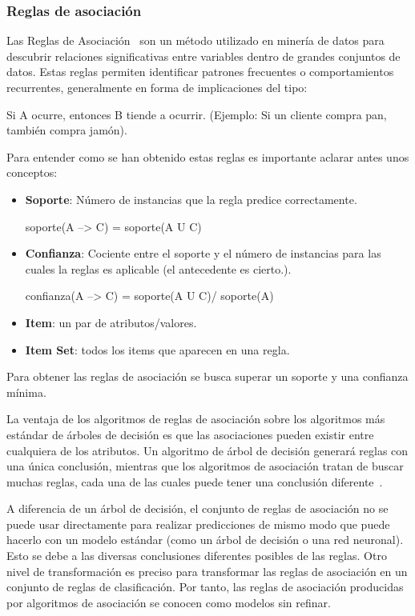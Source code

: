 \subsubsection{Reglas de asociación}
Las Reglas de Asociación~\cite{DTM:Rules} son un método utilizado en minería de datos para descubrir relaciones significativas entre variables dentro de grandes conjuntos de datos. Estas reglas permiten identificar patrones frecuentes o comportamientos recurrentes, generalmente en forma de implicaciones del tipo:

Si A ocurre, entonces B tiende a ocurrir.
(Ejemplo: Si un cliente compra pan, también compra jamón).

Para entender como se han obtenido estas reglas es importante aclarar antes unos conceptos:


\begin{itemize}
    \item \textbf{Soporte}: Número de instancias que la regla predice correctamente.
    
    soporte(A --> C) = soporte(A U C)
    
    \item \textbf{Confianza}: Cociente entre el soporte y el número de instancias para las cuales la reglas es aplicable (el antecedente es cierto.).
    
    confianza(A --> C) = soporte(A U C)/ soporte(A)
    
    \item \textbf{Item}: un par de atributos/valores.

    \item \textbf{Item Set}:  todos los items que aparecen en una regla.
    
\end{itemize}

Para obtener las reglas de asociación se busca superar un soporte y una confianza mínima.  

La ventaja de los algoritmos de reglas de asociación sobre los algoritmos más estándar de árboles de decisión es que las asociaciones pueden existir entre cualquiera de los atributos. Un algoritmo de árbol de decisión generará reglas con una única conclusión, mientras que los algoritmos de asociación tratan de buscar muchas reglas, cada una de las cuales puede tener una conclusión diferente~\cite{DTM:Aso}.

 A diferencia de un árbol de decisión, el conjunto de reglas de asociación no se puede usar directamente para realizar predicciones de mismo modo que puede hacerlo con un modelo estándar (como un árbol de decisión o una red neuronal). Esto se debe a las diversas conclusiones diferentes posibles de las reglas. Otro nivel de transformación es preciso para transformar las reglas de asociación en un conjunto de reglas de clasificación. Por tanto, las reglas de asociación producidas por algoritmos de asociación se conocen como modelos sin refinar. 

